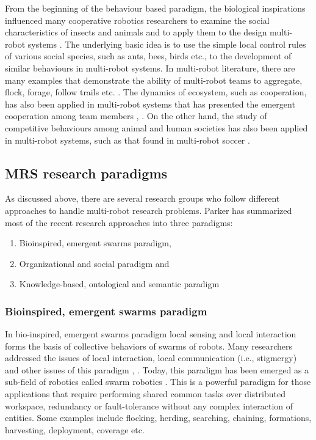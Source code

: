 From the beginning of the behaviour based paradigm, the biological inspirations influenced many cooperative robotics researchers  to examine the social characteristics of insects and animals and  to apply them  to the design multi-robot systems \cite{Arkin1998}. The underlying basic idea is to use the simple local control rules of various social species, such as ants, bees, birds etc.,  to the development of  similar behaviours in multi-robot systems. In multi-robot literature, there are many examples that demonstrate the ability of multi-robot teams to aggregate, flock, forage, follow trails etc. \cite{Bonabeau+1999,Mataric1994}. The dynamics of ecosystem, such as cooperation,  has also been applied in multi-robot systems that has presented the emergent cooperation among team members \cite{Mcfarland1994}, \cite{Martinoli+1996}. On the other hand, the study of competitive behaviours among animal and human societies has also been applied in multi-robot systems, such as that found in multi-robot soccer \cite{Asada+1999}.

\subsection{MRS research paradigms}
\label{sec:mrs-paradigms}
As discussed above, there are several research groups who follow different approaches to handle multi-robot research problems. Parker \cite{Parker2008} has summarized most of the recent research approaches  into three paradigms:
\begin{enumerate}
\item Bioinspired, emergent swarms paradigm,
\item Organizational and social paradigm  and
\item Knowledge-based, ontological and semantic paradigm
\end{enumerate}

\subsubsection*{Bioinspired, emergent swarms paradigm}
In bio-inspired, emergent swarms paradigm local sensing and local interaction forms the basis of collective behaviors of swarms of robots. Many researchers addressed the issues of local interaction, local communication (i.e., stigmergy) and other issues of this paradigm \cite{Mataric1995}, \cite{Kube+1993}. Today, this paradigm has been emerged as a sub-field of robotics called swarm robotics \cite{Sahin+2005}. This is a powerful paradigm for those applications that require performing shared common tasks over distributed workspace, redundancy or fault-tolerance without any complex interaction of entities. Some examples include flocking, herding, searching, chaining, formations, harvesting, deployment, coverage etc. 

